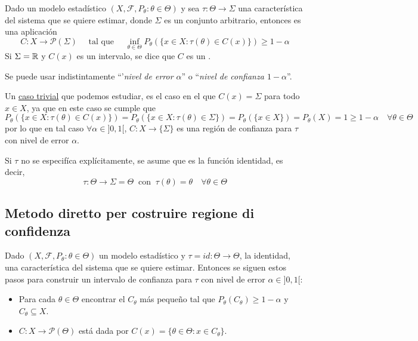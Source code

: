 \begin{definicion}
    Dado un modelo estadístico $(X, \mathcal{F}, P_{\theta}: \theta \in \Theta)$ y sea  $\tau: \Theta \to \Sigma$ una característica del sistema que se quiere estimar, donde $\Sigma$ es un conjunto arbitrario, entonces \tbf{una región de confianza para $\tau$ con nivel de error $\alpha\in ]0,1[$ (o nivel de confianza $1-\alpha$)} es una aplicación
    \begin{equation*}
        C: X \to \mathcal{P}(\Sigma) \quad \text{ tal que } \quad \inf_{\theta \in \Theta} P_{\theta}(\{x \in X : \tau(\theta) \in C(x)\}) \geq 1 - \alpha
    \end{equation*}
    Si $\Sigma=\mathbb{R}$ y $C(x)$ es un intervalo, se dice que $C$ es un .
\end{definicion}

\begin{observacion}
    Se puede usar indistintamente ``'\textit{nivel de error $\alpha$}'' o ``\textit{nivel de confianza $1-\alpha$}''.
\end{observacion}

\noindent
Un \underline{caso trivial} que podemos estudiar, es el caso en el que $C(x) = \Sigma$ para todo $x \in X$, ya que en este caso se cumple que
\begin{equation*}
    P_{\theta}(\{x \in X : \tau(\theta) \in C(x)\}) = P_{\theta}(\{x \in X : \tau(\theta) \in \Sigma\}) =P_{\theta}(\{x\in X\})= P_{\theta}(X) = 1 \geq 1 - \alpha \quad \forall \theta \in \Theta
\end{equation*}
por lo que en tal caso $\forall \alpha \in ]0,1[$, $C:X\to \{\Sigma\}$ es una región de confianza para $\tau$ con nivel de error $\alpha$. \\ 
\begin{observacion}
    Si $\tau$ no se especifíca explícitamente, se asume que es la función identidad, es decir, 
    $$\tau: \Theta \to \Sigma=\Theta \ \text{ con } \ \tau(\theta) = \theta \quad \forall \theta \in \Theta$$
\end{observacion}

\subsection{Metodo diretto per costruire regione di confidenza}
\begin{teo}
    Dado $(X, \mathcal{F}, P_{\theta}: \theta \in \Theta)$ un modelo estadístico y $\tau=id: \Theta \to \Theta$, la identidad, una característica del sistema que se quiere estimar. Entonces se siguen estos pasos para construir un intervalo de confianza para $\tau$ con nivel de error $\alpha \in ]0,1[$:
    \begin{itemize}
        \item Para cada $\theta \in \Theta$ encontrar el $C_{\theta}$ más pequeño tal que $P_{\theta}(C_{\theta}) \geq 1 - \alpha$ y $C_{\theta} \subseteq X$.
        \item $C: X \to \mathcal{P}(\Theta)$ está dada por $C(x) = \{\theta \in \Theta : x \in C_{\theta}\}$.
    \end{itemize}
\end{teo}


